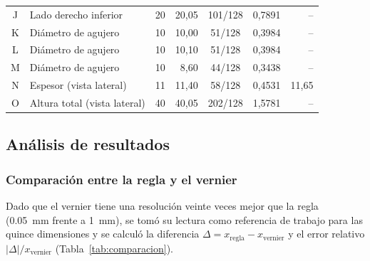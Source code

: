 \documentclass[12pt,a4paper]{article}
\begin{document}
\begin{table}[!htb]
\begin{tabular}{c l r r c r r}
		\\
		J               & Lado derecho inferior               & 20              &
		20,05
		                & 101/128                             & 0,7891          & --
		\\
		K               & Diámetro de agujero                 & 10              &
		10,00           & 51/128                              & 0,3984          & --
		\\
		L               & Diámetro de agujero                 & 10              &
		10,10
		                & 51/128                              & 0,3984          & --
		\\
		M               & Diámetro de agujero                 & 10              &
		8,60            & 44/128                              & 0,3438          & --
		\\
		N               & Espesor (vista lateral)             & 11              &
		11,40
		                & 58/128                              & 0,4531          &
		11,65
		\\
		O               & Altura total (vista lateral)        & 40              &
		40,05           & 202/128                             & 1,5781          & --
		\\
	\end{tabular}
\end{table}

\subsection{Análisis de resultados}

\subsubsection{Comparación entre la regla y el vernier}

Dado que el vernier tiene una resolución veinte veces mejor que la regla
(\SI{0.05}{\milli\metre} frente a \SI{1}{\milli\metre}), se tomó su lectura como
referencia de trabajo para las quince dimensiones y se calculó la diferencia
$\Delta = x_{\text{regla}} - x_{\text{vernier}}$ y el error relativo
$|\Delta|/x_{\text{vernier}}$ (Tabla~\ref{tab:comparacion}).
\end{document}
